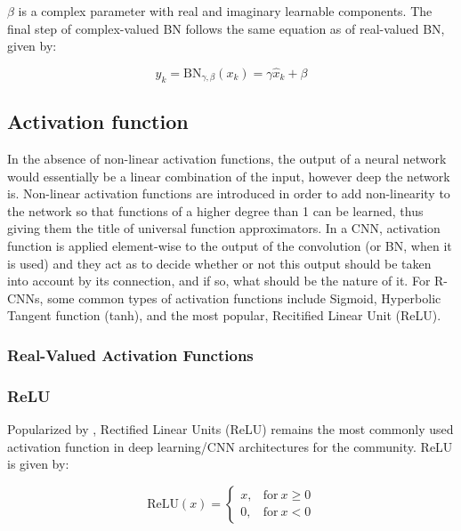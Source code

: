 $\beta$ is a complex parameter with real and imaginary learnable components. The final step of complex-valued BN follows the same equation as of real-valued BN, given by:

 \begin{equation}
y_{k} = \mathrm{BN}_{\gamma,\beta}(x_{k}) = \gamma\hat{x}_{k} + \beta
\label{eqcbn5}
\end{equation}

 \subsection{Activation function}\label{ssec:act_fn}
 In the absence of non-linear activation functions, the output of a neural network would essentially be a linear combination of the input, however deep the network is. Non-linear activation functions are introduced in order to add non-linearity to the network so that functions of a higher degree than 1 can be learned, thus giving them the title of universal function approximators. In a CNN, activation function is applied element-wise to the output of the convolution (or BN, when it is used) and they act as to decide whether or not this output should be taken into account by its connection, and if so, what should be the nature of it. For $\mathrm{R}$-CNNs, some common types of activation functions include Sigmoid, Hyperbolic Tangent function (tanh), and the most popular, Recitified Linear Unit (ReLU).
 
 
  \subsubsection{Real-Valued Activation Functions}
   \subsubsection{ReLU}
   
Popularized by \cite{krizhevsky2012imagenet}, Rectified Linear Units (ReLU) \cite{nair2010rectified} remains the most commonly used activation function in deep learning/CNN architectures for the community. ReLU is given by:

\begin{equation}
\mathrm{ReLU}(x) =  
\begin{cases} 
x , &\textrm{for} \ x\ge 0\\
0 , &\textrm{for} \ x < 0
\end{cases}
\end{equation}
 
